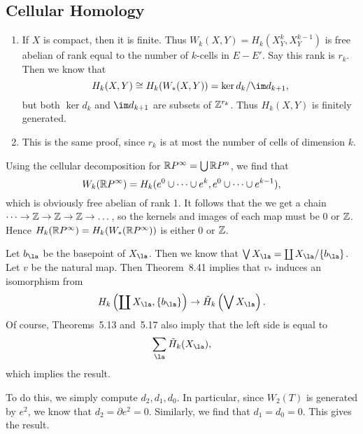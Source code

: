 \documentclass[../../solutions.tex]{subfiles}
\begin{document}
\subsection{Cellular Homology}
\begin{exercise} \leavevmode
\frownie
\end{exercise}

\begin{exercise} \leavevmode
\begin{enumerate}
\item
If $X$ is compact, then it is finite.
Thus $W_k(X,Y)=H_k(X^k_Y,X^{k-1}_Y)$ is free abelian of rank equal to the number of $k$-cells in $E-E'$.
Say this rank is $r_k$.
Then we know that
\[H_k(X,Y)\cong H_k(W_*(X,Y))=\ker d_k/\im d_{k+1},\]
but both $\ker d_k$ and $\im d_{k+1}$ are subsets of $\mathbb{Z}^{r_k}$.
Thus $H_k(X,Y)$ is finitely generated.

\item
This is the same proof, since $r_k$ is at most the number of cells of dimension $k$.
\end{enumerate}
\end{exercise}

\begin{exercise} \leavevmode
Using the cellular decomposition for $\mathbb{R} P^\infty=\bigcup\mathbb{R} P^n$, we find that
\[W_k(\mathbb{R} P^\infty)=H_k(e^0\cup\dots\cup e^k,e^0\cup\dots\cup e^{k-1}),\]
which is obviously free abelian of rank 1.
It follows that the we get a chain $\dots\to\mathbb{Z}\to\mathbb{Z}\to\mathbb{Z}\to\dots$, so the kernels and images of each map must be 0 or $\mathbb{Z}$.
Hence $H_k(\mathbb{R} P^\infty)=H_k(W_*(\mathbb{R} P^\infty))$ is either 0 or $\mathbb{Z}$.
\end{exercise}

\begin{exercise} \leavevmode
Let $b_\la$ be the basepoint of $X_\la$.
Then we know that $\bigvee X_\la=\coprod X_\la/\{b_\la\}$.
Let $v$ be the natural map.
Then Theorem~8.41 implies that $v_*$ induces an isomorphism from \[H_k\left(\coprod X_\la,\{b_\la\}\right)\to\tilde H_k\left(\bigvee X_\la\right).\]
Of course, Theorems~5.13 and~5.17 also imply that the left side is equal to
\[\sum_\la\tilde H_k(X_\la),\]
which implies the result.
\end{exercise}

\begin{exercise} \leavevmode
To do this, we simply compute $d_2,d_1,d_0$.
In particular, since $W_2(T)$ is generated by $e^2$, we know that $d_2=\partial e^2=0$.
Similarly, we find that $d_1=d_0=0$.
This gives the result.
\end{exercise}
\end{document}
